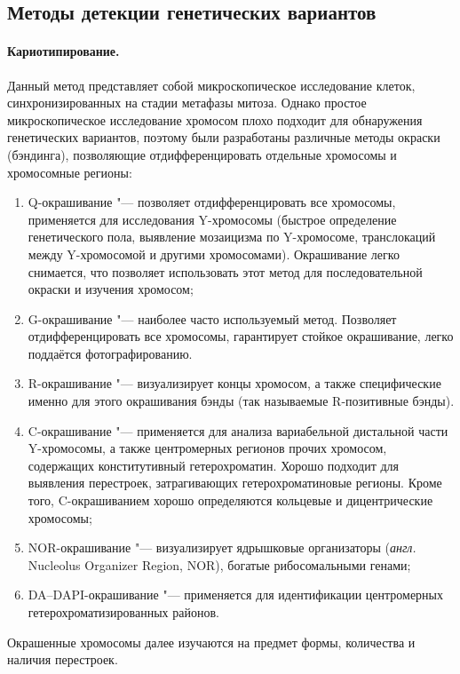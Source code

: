 \documentclass[a4paper,12pt]{article}
\begin{document}
\subsection{Методы детекции генетических вариантов}

\paragraph{Кариотипирование.}
Данный метод представляет собой микроскопическое исследование клеток, синхронизированных на стадии метафазы митоза.
Однако простое микроскопическое исследование хромосом плохо подходит для обнаружения генетических вариантов, поэтому были разработаны различные методы окраски (бэндинга), позволяющие отдифференцировать отдельные хромосомы и хромосомные регионы\cite{Schreck_2001}:

\begin{enumerate}
\item Q-окрашивание "--- позволяет отдифференцировать все хромосомы, применяется для исследования Y-хромосомы (быстрое определение генетического пола, выявление мозаицизма по Y-хромосоме, транслокаций между Y-хромосомой и другими хромосомами).
Окрашивание легко снимается, что позволяет использовать этот метод для последовательной окраски и изучения хромосом;
\item G-окрашивание "--- наиболее часто используемый метод.
Позволяет отдифференцировать все хромосомы, гарантирует стойкое окрашивание, легко поддаётся фотографированию.
\item R-окрашивание "--- визуализирует концы хромосом, а также специфические именно для этого окрашивания бэнды (так называемые R-позитивные бэнды).
\item C-окрашивание "--- применяется для анализа вариабельной дистальной части Y-хромосомы, а также центромерных регионов прочих хромосом, содержащих конститутивный гетерохроматин.
Хорошо подходит для выявления перестроек, затрагивающих гетерохроматиновые регионы.
Кроме того, C-окрашиванием хорошо определяются кольцевые и дицентрические хромосомы;
\item NOR-окрашивание "--- визуализирует ядрышковые организаторы (\textit{англ.} Nucleolus Organizer Region, NOR), богатые рибосомальными генами;
\item DA--DAPI-окрашивание "--- применяется для идентификации центромерных гетерохроматизированных районов.
\end{enumerate}

Окрашенные хромосомы далее изучаются на предмет формы, количества и наличия перестроек.
\end{document}
